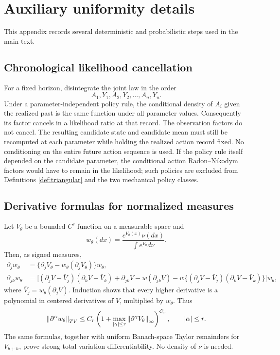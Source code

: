 
\section{Auxiliary uniformity details}
\label{app:uniformity}

This appendix records several deterministic and probabilistic steps used in
the main text.

\subsection{Chronological likelihood cancellation}

For a fixed horizon, disintegrate the joint law in the order
\[
 A_1,Y_1,A_2,Y_2,\ldots,A_n,Y_n.
\]
Under a parameter-independent policy rule, the conditional density of \(A_i\)
given the realized past is the same function under all parameter values.
Consequently its factor cancels in a likelihood ratio at that record.  The
observation factors do not cancel.  The resulting candidate state and
candidate mean must still be recomputed at each parameter while holding the
realized action record fixed.  No conditioning on the entire future action
sequence is used.  If the policy rule itself depended on the candidate
parameter, the conditional action Radon--Nikodym factors would have to remain
in the likelihood; such policies are excluded from Definitions
\ref{def:triangular} and the two mechanical policy classes.

\subsection{Derivative formulas for normalized measures}

Let \(V_\theta\) be a bounded \(C^r\) function on a measurable space and
\[
 w_\theta(dx)=
 \frac{e^{V_\theta(x)}\nu(dx)}{\int e^{V_\theta}d\nu}.
\]
Then, as signed measures,
\begin{align*}
 \partial_jw_\theta
 &=\{\partial_jV_\theta-
       w_\theta(\partial_jV_\theta)\}w_\theta,\\
 \partial_{jk}w_\theta
 &=\bigl[(\partial_jV-\bar V_j)(\partial_kV-\bar V_k)
   +\partial_{jk}V-w(\partial_{jk}V)
   -w\{(\partial_jV-\bar V_j)(\partial_kV-\bar V_k)\}\bigr]w_\theta,
\end{align*}
where \(\bar V_j=w_\theta(\partial_jV)\).  Induction shows that every
higher derivative is a polynomial in centered derivatives of \(V\),
multiplied by \(w_\theta\).  Thus
\[
 \left\|\partial^\alpha w_\theta\right\|_{TV}
 \le C_r\left(1+\max_{\left|\gamma\right|\le r}
 \left\|\partial^\gamma V_\theta\right\|_\infty\right)^{C_r},
 \qquad \left|\alpha\right|\le r.
\]
The same formulas, together with uniform Banach-space Taylor remainders for
\(V_{\theta+h}\), prove strong total-variation differentiability.  No density
of \(\nu\) is needed.

